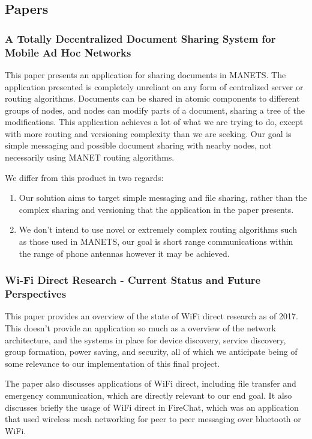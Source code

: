\documentclass[10pt]{article}
\begin{document}
\newpage

\subsection{Papers}

\subsubsection{A Totally Decentralized Document Sharing System for Mobile Ad Hoc Networks}

This paper  \cite{10.1145/1164783.1164805} presents an application for sharing documents in MANETS. The application presented is completely unreliant on any form of centralized server or routing algorithms. Documents can be shared in atomic components to different groups of nodes, and nodes can modify parts of a document, sharing a tree of the modifications. This application achieves a lot of what we are trying to do, except with more routing and versioning complexity than we are seeking. Our goal is simple messaging and possible document sharing with nearby nodes, not necessarily using MANET routing algorithms.

We differ from this product in two regards:
\begin{enumerate}
    \item Our solution aims to target simple messaging and file sharing, rather than the complex sharing and versioning that the application in the paper presents.
    \item We don't intend to use novel or extremely complex routing algorithms such as those used in MANETS, our goal is short range communications within the range of phone antennas however it may be achieved.
\end{enumerate}

\subsubsection{Wi-Fi Direct Research - Current Status and Future Perspectives}
This paper  \cite{WifiDirect} provides an overview of the state of WiFi direct research as of 2017. This doesn't provide an application so much as a overview of the network architecture, and the systems in place for device discovery, service discovery, group formation, power saving, and security, all of which we anticipate being of some relevance to our implementation of this final project.

The paper also discusses applications of WiFi direct, including file transfer and emergency communication, which are directly relevant to our end goal. It also discusses briefly the usage of WiFi direct in FireChat, which was an application that used wireless mesh networking for peer to peer messaging over bluetooth or WiFi.
\end{document}
